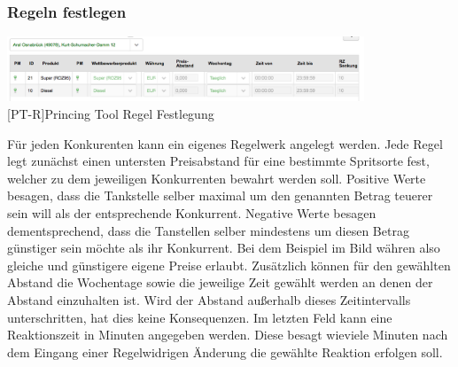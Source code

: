 \documentclass[12pt,a4paper,bibliography=totocnumbered,listof=totocnumbered]{scrartcl}
\begin{document}
\subsubsection{Regeln festlegen}
\begin{center}
	\includegraphics[width=0.8\textwidth]{Bilder/regeln1.png}\\
	[PT-R]{Princing Tool Regel Festlegung}
	\label{fig:PT-R}
\end{center}
Für jeden Konkurenten kann ein eigenes Regelwerk angelegt werden. Jede Regel legt zunächst einen untersten Preisabstand für eine bestimmte Spritsorte fest, welcher zu dem jeweiligen Konkurrenten bewahrt werden soll. Positive Werte besagen, dass die Tankstelle selber maximal um den genannten Betrag teuerer sein will als der entsprechende Konkurrent. Negative Werte besagen dementsprechend, dass die Tanstellen selber mindestens um diesen Betrag günstiger sein möchte als ihr Konkurrent. Bei dem Beispiel im Bild währen also gleiche und günstigere eigene Preise erlaubt. Zusätzlich können für den gewählten Abstand die Wochentage sowie die jeweilige Zeit gewählt werden an denen der Abstand einzuhalten ist. Wird der Abstand außerhalb dieses Zeitintervalls unterschritten, hat dies keine Konsequenzen. Im letzten Feld kann eine Reaktionszeit in Minuten angegeben werden. Diese besagt wieviele Minuten nach dem Eingang einer Regelwidrigen Änderung die gewählte Reaktion erfolgen soll.

\end{document}
